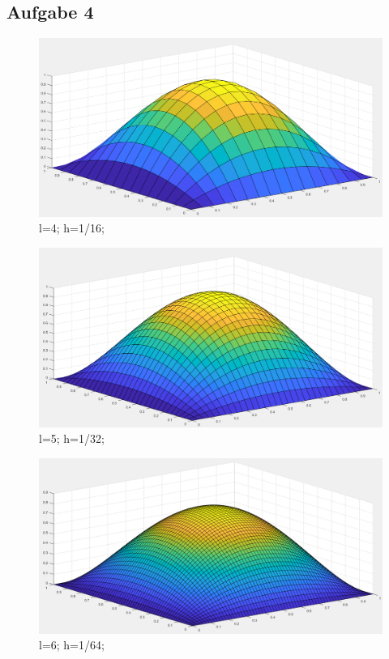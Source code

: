 \documentclass{report}
\begin{document}
    \subsection{Aufgabe 4}
	\begin{figure}
		\includegraphics[width=\linewidth]{Aufgaben-Ressourcen/A4L4.png}
		\caption{l=4; h=1/16;}
		\label{A4L4}
	\end{figure}
\begin{figure}
		\includegraphics[width=\linewidth]{Aufgaben-Ressourcen/A4L5.png} 
		\caption{l=5; h=1/32;}
		\label{A4L5}
	\end{figure}
	\begin{figure}
		\includegraphics[width=\linewidth]{Aufgaben-Ressourcen/A4L6.png} 
		\caption{l=6; h=1/64;}
		\label{A4L6}
	\end{figure}
\end{document}
